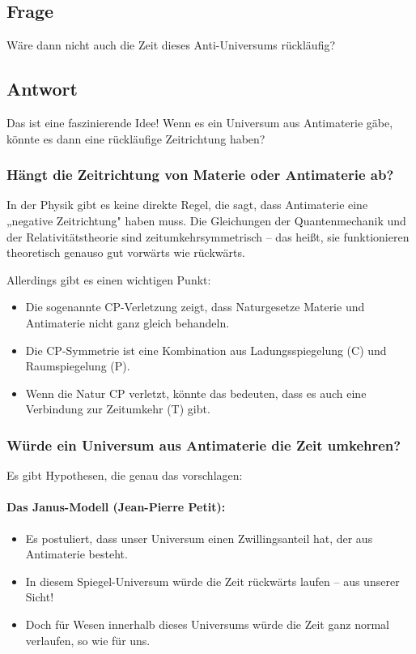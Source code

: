 \documentclass{article}
\begin{document}
	\subsection{Frage}
	Wäre dann nicht auch die Zeit dieses Anti-Universums rückläufig?
	
	\subsection{Antwort}
	Das ist eine faszinierende Idee! Wenn es ein Universum aus Antimaterie gäbe, könnte es dann eine rückläufige Zeitrichtung haben?
	
	\subsubsection{Hängt die Zeitrichtung von Materie oder Antimaterie ab?}
	In der Physik gibt es keine direkte Regel, die sagt, dass Antimaterie eine „negative Zeitrichtung" haben muss. Die Gleichungen der Quantenmechanik und der Relativitätstheorie sind zeitumkehrsymmetrisch – das heißt, sie funktionieren theoretisch genauso gut vorwärts wie rückwärts.
	
	Allerdings gibt es einen wichtigen Punkt:
	\begin{itemize}
		\item Die sogenannte CP-Verletzung zeigt, dass Naturgesetze Materie und Antimaterie nicht ganz gleich behandeln.
		\item Die CP-Symmetrie ist eine Kombination aus Ladungsspiegelung (C) und Raumspiegelung (P).
		\item Wenn die Natur CP verletzt, könnte das bedeuten, dass es auch eine Verbindung zur Zeitumkehr (T) gibt.
	\end{itemize}
	
	\subsubsection{Würde ein Universum aus Antimaterie die Zeit umkehren?}
	Es gibt Hypothesen, die genau das vorschlagen:
	
	\paragraph{Das Janus-Modell (Jean-Pierre Petit):}
	\begin{itemize}
		\item Es postuliert, dass unser Universum einen Zwillingsanteil hat, der aus Antimaterie besteht.
		\item In diesem Spiegel-Universum würde die Zeit rückwärts laufen – aus unserer Sicht!
		\item Doch für Wesen innerhalb dieses Universums würde die Zeit ganz normal verlaufen, so wie für uns.
	\end{itemize}
	
\end{document}
